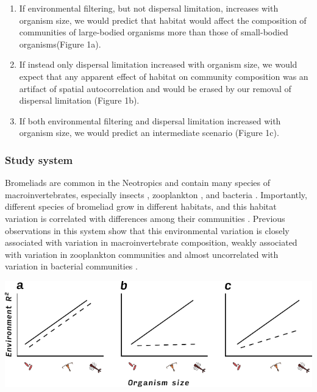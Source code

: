 \begin{enumerate}
\def\labelenumi{\arabic{enumi}.}
\item
  If environmental filtering, but not dispersal limitation, increases
  with organism size, we would predict that habitat would affect the
  composition of communities of large-bodied organisms more than those
  of small-bodied organisms(Figure 1a). 
\item
  If instead only dispersal limitation increased with organism size, we
  would expect that any apparent effect of habitat on community
  composition was an artifact of spatial autocorrelation and would be
  erased by our removal of dispersal limitation (Figure 1b).
\item
  If both environmental filtering and dispersal limitation increased
  with organism size, we would predict an intermediate scenario (Figure
  1c).
\end{enumerate}

\subsubsection{Study system}\label{study-system}

Bromeliads are common in the Neotropics and contain many species of
macroinvertebrates, especially insects \citep{Frank2009}, zooplankton
\citep{Petermann2015}, and bacteria \citep{Haubrich2009a}. Importantly,
different species of bromeliad grow in different habitats, and this
habitat variation is correlated with differences among their communities
\citep{Marino2012}. Previous observations in this system show that this
environmental variation is closely associated with variation in
macroinvertebrate composition, weakly associated with variation in
zooplankton communities and almost uncorrelated with variation in
bacterial communities \citep{Farjalla2012}.

\includegraphics{figures/hypotheses_illustration.pdf}

